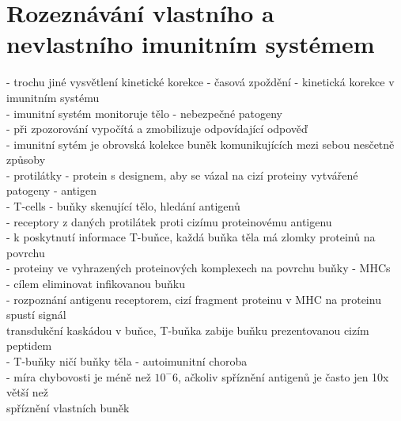 \documentclass[11pt,a4paper]{report}
\begin{document}
\section{Rozeznávání vlastního a nevlastního imunitním systémem}
- trochu jiné vysvětlení kinetické korekce - časová zpoždění - kinetická korekce v imunitním systému\\
- imunitní systém monitoruje tělo - nebezpečné patogeny\\
\indent - při zpozorování vypočítá a zmobilizuje odpovídající odpověď\\
\indent - imunitní sytém je obrovská kolekce buněk komunikujících mezi sebou nesčetně způsoby\\
\indent - protilátky - protein s designem, aby se vázal na cizí proteiny vytvářené patogeny - antigen\\
\indent - T-cells - buňky skenující tělo, hledání antigenů\\
\indent \indent - receptory z daných protilátek proti cizímu proteinovému antigenu\\
\indent \indent - k poskytnutí informace T-buňce, každá buňka těla má zlomky proteinů na povrchu\\
\indent \indent \indent - proteiny ve vyhrazených proteinových komplexech na povrchu buňky - MHCs\\
\indent \indent - cílem eliminovat infikovanou buňku\\
\indent \indent - rozpoznání antigenu receptorem, cizí fragment proteinu v MHC na proteinu spustí signál\\
\indent \indent \indent transdukční kaskádou v buňce, T-buňka zabije buňku prezentovanou cizím peptidem\\
\indent \indent - T-buňky ničí buňky těla - autoimunitní choroba\\
\indent \indent - míra chybovosti je méně než $10^-6$, ačkoliv spříznění antigenů je často jen 10x větší než\\
\indent \indent \indent spříznění vlastních buněk\\
\end{document}

